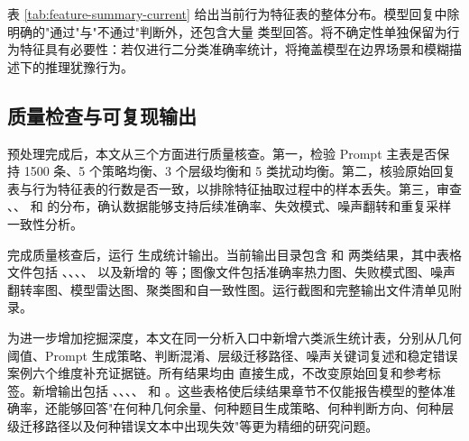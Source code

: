 表 \ref{tab:feature-summary-current} 给出当前行为特征表的整体分布。模型回复中除明确的"通过"与"不通过"判断外，还包含大量  类型回答。将不确定性单独保留为行为特征具有必要性：若仅进行二分类准确率统计，将掩盖模型在边界场景和模糊描述下的推理犹豫行为。

\subsection{质量检查与可复现输出}

预处理完成后，本文从三个方面进行质量核查。第一，检验 Prompt 主表是否保持 1500 条、5 个策略均衡、3 个层级均衡和 5 类扰动均衡。第二，核验原始回复表与行为特征表的行数是否一致，以排除特征抽取过程中的样本丢失。第三，审查 、、 和  的分布，确认数据能够支持后续准确率、失效模式、噪声翻转和重复采样一致性分析。

完成质量核查后，运行  生成统计输出。当前输出目录包含  和  两类结果，其中表格文件包括 、、、、 以及新增的  等；图像文件包括准确率热力图、失败模式图、噪声翻转率图、模型雷达图、聚类图和自一致性图。运行截图和完整输出文件清单见附录。

为进一步增加挖掘深度，本文在同一分析入口中新增六类派生统计表，分别从几何阈值、Prompt 生成策略、判断混淆、层级迁移路径、噪声关键词复述和稳定错误案例六个维度补充证据链。所有结果均由  直接生成，不改变原始回复和参考标签。新增输出包括 、、、、 和 。这些表格使后续结果章节不仅能报告模型的整体准确率，还能够回答"在何种几何余量、何种题目生成策略、何种判断方向、何种层级迁移路径以及何种错误文本中出现失效"等更为精细的研究问题。
